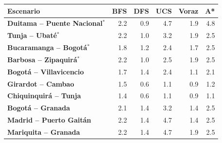 \renewcommand{\arraystretch}{1.2}
\begin{tabular}{|l|r|r|r|r|r|}
\hline
\rowcolor{gray!20} \textbf{Escenario} & \textbf{BFS} & \textbf{DFS} & \textbf{UCS} & \textbf{Voraz} & \textbf{A*} \\
\hline
\textbf{Duitama -- Puente Nacional$^{*}$} & 2.2 & 0.9 & 4.7 & 1.9 & 4.8 \\
\hline
\textbf{Tunja -- Ubaté$^{*}$} & 2.2 & 1.0 & 3.2 & 1.9 & 2.5 \\
\hline
\textbf{Bucaramanga -- Bogotá$^{*}$} & 1.8 & 1.2 & 2.4 & 1.7 & 2.5 \\
\hline
\textbf{Barbosa -- Zipaquirá$^{*}$} & 2.2 & 1.0 & 2.5 & 1.9 & 2.5 \\
\hline
\textbf{Bogotá -- Villavicencio} & 1.7 & 1.4 & 2.4 & 1.1 & 2.1 \\
\hline
\textbf{Girardot -- Cambao} & 1.5 & 0.6 & 1.1 & 0.9 & 1.2 \\
\hline
\textbf{Chiquinquirá -- Tunja} & 1.4 & 0.6 & 1.1 & 0.9 & 1.1 \\
\hline
\textbf{Bogotá -- Granada} & 2.1 & 1.4 & 3.2 & 1.4 & 2.5 \\
\hline
\textbf{Madrid -- Puerto Gaitán} & 2.2 & 1.4 & 4.7 & 1.4 & 2.5 \\
\hline
\textbf{Mariquita -- Granada} & 2.2 & 1.4 & 4.7 & 1.9 & 2.5 \\
\hline
\end{tabular}
